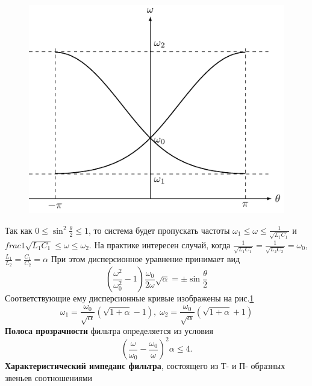 \begin{figure}[h!]
	\centering 
	\includegraphics[]{chem/FF/w(0).pdf}
	\caption{}
	\label{fig:6.11}
\end{figure}
Так как $\displaystyle 0\leq\sin^2\frac{\theta}{2}\leq1$, то система будет пропускать частоты $\displaystyle\omega_1\leq\omega\leq\frac{1}{\sqrt{L_1C_1}}$ и $\displaystyle frac{1}{\sqrt{L_1C_1}}\leq\omega\leq\omega_2$. На практике интересен случай, когда $\displaystyle \frac{1}{\sqrt{L_1C_1}}=\frac{1}{\sqrt{L_2C_2}}=\omega_0$, $\displaystyle \frac{L_1}{L_2}=\frac{C_1}{C_2}=\alpha$
При этом дисперсионное уравнение принимает вид
\begin{equation}
\label{eq:7.4}
\left(\frac{\omega^2}{\omega^2_0}-1\right)\frac{\omega_0}{2\omega}\sqrt{\alpha}=\pm\sin\frac{\theta}{2}
\end{equation}
Соответствующие ему дисперсионные кривые изображены на рис.\ref{fig:6.11}
\begin{equation}
\label{eq:7.5}
\omega_1=\frac{\omega_0}{\sqrt{\alpha}}(\sqrt{1+\alpha}-1),\;
\omega_2=\frac{\omega_0}{\sqrt{\alpha}}(\sqrt{1+\alpha}+1)
\end{equation}
\textbf{Полоса прозрачности} фильтра определяется из условия 
\begin{equation}
\label{eq:7.6}
\left(\frac{\omega}{\omega_0}-\frac{\omega_0}{\omega}\right)^2\alpha\leq 4.
\end{equation}
\textbf{Характеристический импеданс фильтра}, состоящего из Т- и П- образных звеньев соотношениями
